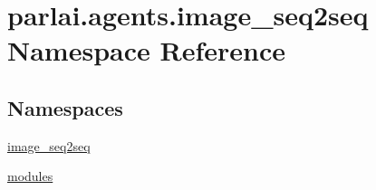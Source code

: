 \hypertarget{namespaceparlai_1_1agents_1_1image__seq2seq}{}\section{parlai.\+agents.\+image\+\_\+seq2seq Namespace Reference}
\label{namespaceparlai_1_1agents_1_1image__seq2seq}
\subsection*{Namespaces}
\begin{DoxyCompactItemize}
\item 
 \hyperlink{namespaceparlai_1_1agents_1_1image__seq2seq_1_1image__seq2seq}{image\+\_\+seq2seq}
\item 
 \hyperlink{namespaceparlai_1_1agents_1_1image__seq2seq_1_1modules}{modules}
\end{DoxyCompactItemize}
